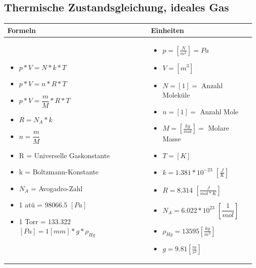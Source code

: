 \newpage

\subsection{Thermische Zustandsgleichung, ideales Gas}				%
\begin{table}[h!]
	\begin{tabular}{ | m{9cm} | m{9cm}  | }
		\hline
		Formeln & Einheiten \\ \hline
		\midrule
		\begin{itemize}
			\item $p*V=N*k*T$	
			\item $p*V=n*R*T$
			\item $p*V=\dfrac{m}{M}*R*T$
			\item $R=N_{A}*k$ 
			\item $n=\dfrac{m}{M}$
			\item R = Universelle Gaskonstante
			\item k = Boltzmann-Konstante
			\item $N_{A}$ = Avogadro-Zahl
			\item {\color{red}1 atü = $98066.5$ $ [Pa]$}
			\item {\color{red}1 Torr = $133.322$ $ [Pa] = 1[mm]*g*\rho_{Hg}$}
		\end{itemize}
		&
		\begin{itemize}
			\item $p= [\frac{N}{m^{2}}]=Pa$
			\item $V=[m^3]$
			\item $N=[1]=$ Anzahl Moleküle
			\item $n=[1]=$ Anzahl Mole
			\item $M=[\frac{kg}{mol}]=$ Molare Masse
			\item $T=[K]$
			\item $k=1.381*10^{-23}$ $[\frac{J}{K}]$
			\item $R=8.314$ $[ \frac{J}{mol*K} ]$
			\item $N_{A}=6.022*10^{23}$ $[\dfrac{1}{mol}] $
			\item $\rho_{Hg}=13595[\frac{kg}{m^3}]$
			\item $g=9.81[\frac{m}{s^2}]$
			
			
			
		\end{itemize}
		\\ \hline
	\end{tabular}
\end{table}


